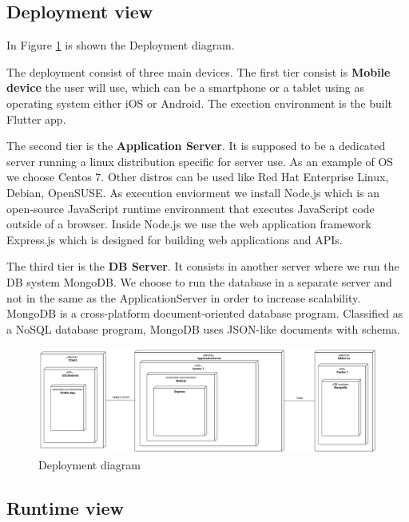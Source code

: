 \subsection{Deployment view}

In Figure \ref{fig:deploy} is shown the Deployment diagram.

The deployment consist of three main devices. The first tier consist is \textbf{Mobile device} the user will use, which can be a smartphone or a tablet using as operating system either iOS or Android.
The exection environment is the built Flutter app.


The second tier is the \textbf{Application Server}. It is supposed to be a dedicated server running a linux distribution specific for server use. As an example of OS we choose Centos 7. Other distros can be used like Red Hat Enterprise Linux, Debian, OpenSUSE.
As execution enviorment we install Node.js which is an open-source JavaScript runtime environment that executes JavaScript code outside of a browser. Inside Node.js we use the web application framework Express.js which is designed for building web applications and APIs.


The third tier is the \textbf{DB Server}. It consists in another server where we run the DB system MongoDB. We choose to run the database in a separate server and not in the same as the ApplicationServer in order to increase scalability. MongoDB is a cross-platform document-oriented database program. Classified as a NoSQL database program, MongoDB uses JSON-like documents with schema.



\begin{figure}
\centering
\includegraphics[width=\textwidth]{Images/DeploymentDiagram1.png}
\caption{\label{fig:deploy} Deployment diagram}
\end{figure}



\subsection{Runtime view}


